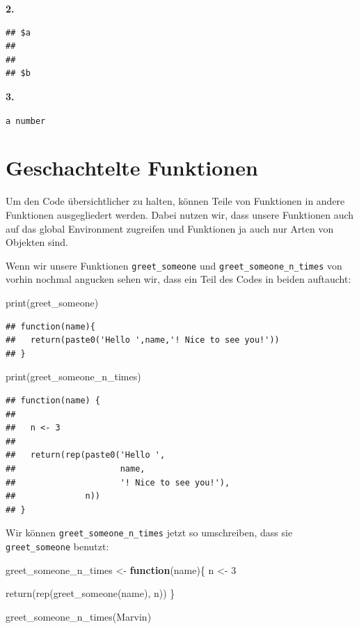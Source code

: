\documentclass[
]{book}
\newenvironment{Shaded}{\begin{snugshade}}{\end{snugshade}}
\newcommand{\ControlFlowTok}[1]{\textcolor[rgb]{0.13,0.29,0.53}{\textbf{#1}}}
\newcommand{\DecValTok}[1]{\textcolor[rgb]{0.00,0.00,0.81}{#1}}
\newcommand{\FunctionTok}[1]{\textcolor[rgb]{0.00,0.00,0.00}{#1}}
\newcommand{\NormalTok}[1]{#1}
\newcommand{\OtherTok}[1]{\textcolor[rgb]{0.56,0.35,0.01}{#1}}
\newcommand{\StringTok}[1]{\textcolor[rgb]{0.31,0.60,0.02}{#1}}
\begin{document}
\textbf{2.}

\begin{verbatim}
## $a
## 
## 
## $b
\end{verbatim}

\textbf{3.}

\texttt{\textquotesingle{}a\ number\textquotesingle{}}

\hypertarget{geschachtelte-funktionen}{%
\section{Geschachtelte Funktionen}\label{geschachtelte-funktionen}}

Um den Code übersichtlicher zu halten, können Teile von Funktionen in andere Funktionen ausgegliedert werden.
Dabei nutzen wir, dass unsere Funktionen auch auf das global Environment zugreifen und Funktionen ja auch nur Arten von Objekten sind.

Wenn wir unsere Funktionen \texttt{greet\_someone} und \texttt{greet\_someone\_n\_times} von vorhin nochmal angucken sehen wir, dass ein Teil des Codes in beiden auftaucht:

\begin{Shaded}
\begin{Highlighting}[]
\FunctionTok{print}\NormalTok{(greet\_someone)}
\end{Highlighting}
\end{Shaded}

\begin{verbatim}
## function(name){
##   return(paste0('Hello ',name,'! Nice to see you!'))
## }
\end{verbatim}

\begin{Shaded}
\begin{Highlighting}[]
\FunctionTok{print}\NormalTok{(greet\_someone\_n\_times)}
\end{Highlighting}
\end{Shaded}

\begin{verbatim}
## function(name) {
##   
##   n <- 3
##   
##   return(rep(paste0('Hello ', 
##                     name, 
##                     '! Nice to see you!'), 
##              n))
## }
\end{verbatim}

Wir können \texttt{greet\_someone\_n\_times} jetzt so umschreiben, dass sie \texttt{greet\_someone} benutzt:

\begin{Shaded}
\begin{Highlighting}[]
\NormalTok{greet\_someone\_n\_times }\OtherTok{\textless{}{-}} \ControlFlowTok{function}\NormalTok{(name)\{}
\NormalTok{  n }\OtherTok{\textless{}{-}} \DecValTok{3}
  
  \FunctionTok{return}\NormalTok{(}\FunctionTok{rep}\NormalTok{(}\FunctionTok{greet\_someone}\NormalTok{(name), }
\NormalTok{             n))}
\NormalTok{\}}


\FunctionTok{greet\_someone\_n\_times}\NormalTok{(}\StringTok{\textquotesingle{}Marvin\textquotesingle{}}\NormalTok{)}
\end{Highlighting}
\end{Shaded}
\end{document}
